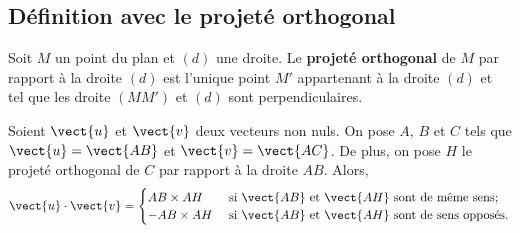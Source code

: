 \documentclass{article}
\begin{document}
\subsection{Définition avec le projeté orthogonal}
\begin{tcolorbox}
    
\begin{definition}[Rappel]
Soit $M$ un point du plan et $(d)$ une droite. Le \textbf{projeté orthogonal} de $M$ par rapport à la droite $(d)$ est l'unique point $M'$ appartenant à la droite $(d)$ et tel que les droite $(MM')$ et $(d)$ sont perpendiculaires.
\end{definition}
\end{tcolorbox}
\begin{proposition}
Soient $\vect{u}$ et $\vect{v}$ deux vecteurs non nuls. On pose $A$, $B$ et $C$ tels que $\vect{u} = \vect{AB}$ et $\vect{v} = \vect{AC}$. De plus, on pose $H$ le projeté orthogonal de $C$ par rapport à la droite $AB$. Alors,
\begin{equation*}
\vect{u} \cdot \vect{v} = 
\begin{cases}
AB \times AH & \text{ si $\vect{AB}$ et $\vect{AH}$ sont de même sens;}\\
- AB \times AH& \text{ si $\vect{AB}$ et $\vect{AH}$ sont de sens opposés.}
\end{cases}
\end{equation*}
\end{proposition}
\emptybox{3cm}
\end{document}

